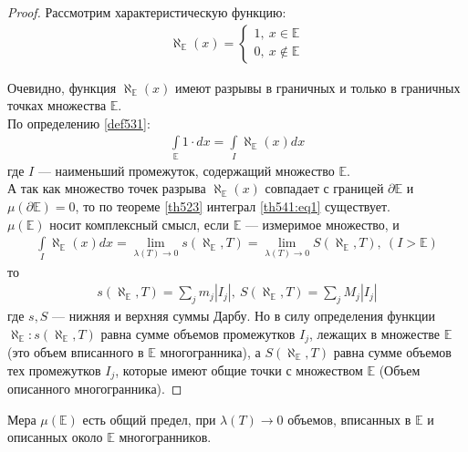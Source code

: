 \begin{proof}
  Рассмотрим характеристическую функцию:
  \begin{gather*}
    \aleph_{\mathbb{E}}(x) =
    \begin{cases}
      1, \ x \in \mathbb{E} \\
      0, \ x \not \in \mathbb{E}
    \end{cases}
  \end{gather*}
  \begin{comment}
    $\aleph$ --- Алеф.
  \end{comment}
  Очевидно, функция $\aleph_{\mathbb{E}}(x)$ имеют разрывы в граничных и только
  в граничных точках множества $\mathbb{E}$. \\
  По определению \eqref{def531}:
  \begin{gather}
    \int\limits_{\mathbb{E}} 1 \cdot dx = \int\limits_I \aleph_{\mathbb{E}}(x)
    dx
    \label{th541:eq1}
  \end{gather}
  где $I$ --- наименьший промежуток, содержащий множество $\mathbb{E}$. \\
  А так как множество точек разрыва $\aleph_{\mathbb{E}}(x)$ совпадает с
  границей $\partial \mathbb{E}$ и $\mu(\partial \mathbb{E}) = 0$, то по
  теореме \eqref{th523} интеграл \eqref{th541:eq1} существует. \\
  $\mu(\mathbb{E})$ носит комплексный смысл, если $\mathbb{E}$ --- измеримое
  множество, и
  \begin{gather*}
    \int\limits_I \aleph_{\mathbb{E}}(x) dx = \lim\limits_{\lambda(T) \to 0}
    s(\aleph_{\mathbb{E}}, T) = \lim\limits_{\lambda(T) \to 0}
    S(\aleph_{\mathbb{E}}, T), \ (I > \mathbb{E})
  \end{gather*}
  то
  \begin{gather*}
    s(\aleph_{\mathbb{E}}, T) = \sum\limits_{j} m_j |I_j|, \
    S(\aleph_{\mathbb{E}}, T) = \sum\limits_{j} M_j |I_j|
  \end{gather*}
  где $s, S$ --- нижняя и верхняя суммы Дарбу. Но в силу определения функции
  $\aleph_{\mathbb{E}}: s(\aleph_{\mathbb{E}}, T)$ равна сумме объемов
  промежутков $I_j$, лежащих в множестве $\mathbb{E}$ (это объем вписанного в
  $\mathbb{E}$ многогранника), а $S(\aleph_{\mathbb{E}}, T)$ равна сумме
  объемов тех промежутков $I_j$, которые имеют общие точки с множеством
  $\mathbb{E}$ (Объем описанного многогранника).
\end{proof}

\begin{approval}
  Мера $\mu(\mathbb{E})$ есть общий предел, при $\lambda(T) \to 0$ объемов,
  вписанных в $\mathbb{E}$ и описанных около $\mathbb{E}$ многогранников.
\end{approval}

